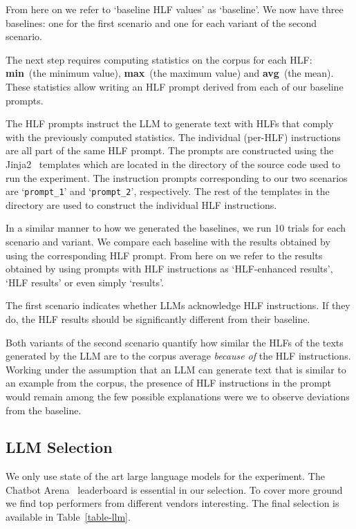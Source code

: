 \documentclass[11pt]{article}
\begin{document}
From here on we refer to `baseline HLF values' as `baseline'.
We now have three baselines: one for the first scenario and one for each variant
of the second scenario.

The next step requires computing statistics on the corpus for each HLF:\@
\textbf{min}~(the minimum value), \textbf{max}~(the maximum value) and
\textbf{avg}~(the mean).
These statistics allow writing an HLF prompt derived from each of our baseline
prompts.

The HLF prompts instruct the LLM to generate text with HLFs that comply with the
previously computed statistics.
The individual (per-HLF) instructions are all part of the same HLF prompt.
The prompts are constructed using the Jinja2~\cite{jinja2} templates which are
located in the \texttt{}
directory of the source code used to run the experiment.
The instruction prompts corresponding to our two scenarios are
`\texttt{prompt\_1}' and `\texttt{prompt\_2}', respectively.
The rest of the templates in the directory are used to construct the individual
HLF instructions.

In a similar manner to how we generated the baselines, we run 10 trials for each
scenario and variant.
We compare each baseline with the results obtained by using the corresponding
HLF prompt.
From here on we refer to the results obtained by using prompts with HLF
instructions as `HLF-enhanced results', `HLF results' or even simply `results'.

The first scenario indicates whether LLMs acknowledge HLF instructions.
If they do, the HLF results should be significantly different from their
baseline.

Both variants of the second scenario quantify how similar the HLFs of the texts
generated by the LLM are to the corpus average \textit{because of} the HLF
instructions.
Working under the assumption that an LLM can generate text that is similar to an
example from the corpus, the presence of HLF instructions in the prompt would
remain among the few possible explanations were we to observe deviations from
the baseline.

\subsection{LLM Selection}\label{llm-selection}

We only use state of the art large language models for the experiment.
The Chatbot Arena~\cite{chiang2024chatbot} leaderboard is essential in our
selection.
To cover more ground we find top performers from different vendors interesting.
The final selection is available in Table~\ref{table-llm}.
\end{document}
